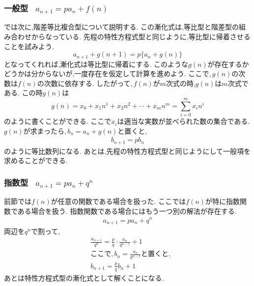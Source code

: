 \documentclass[dvipdfmx,a4paper,11pt,fleqn,openany]{jsbook}
\begin{document}
    \subsubsection{一般型 \, $\displaystyle a_{n+1}=pa_n+f(n)$}
      では次に,階差等比複合型について説明する.
      この漸化式は,等比型と階差型の組み合わせからなっている.
      先程の特性方程式型と同じように,等比型に帰着させることを試みよう.
      \[
        a_{n+1}+g(n+1)=p\{a_n+g(n)\}
      \]
      となってくれれば,漸化式は等比型に帰着にする.
      このような$g(n)$が存在するかどうかは分からないが,一度存在を仮定して計算を進めよう.
      ここで,\,$g(n)$の次数は$f(n)$の次数に依存する.
      したがって,\,$f(n)$が$m$次式の時,$g(n)$は$m$次式である.
      この時$g(n)$は
      \[
        g(n) = x_0 + x_1 n^1 + x_2 n^2  + \cdots +x_{m} n^m =\sum_{i=0}^{m} x_i n^{i}
      \]
      のように書くことができる.
      ここで$x_i$は適当な実数が並べられた数の集合である.
      $g(n)$が求まったら,\,$b_n=a_n+g(n)$と置くと,
      \begin{align*}
        b_{n+1}=pb_n
      \end{align*}
      のように等比数列になる.
      あとは,先程の特性方程式型と同じようにして一般項を求めることができる.
    \subsubsection{指数型  \, $\displaystyle a_{n+1}=pa_n+q^n$}
      前節では$f(n)$が任意の関数である場合を扱った.
      ここでは$f(n)$が特に指数関数である場合を扱う.
      指数関数である場合にはもう一つ別の解法が存在する.
      \begin{align*}
        a_{n+1}=pa_n+q^n
      \end{align*}
      両辺を$q^n$で割って,
      \begin{align*}      
        &\frac{a_{n+1}}{q^n}=\frac{p}{q}\cdot\frac{a_n}{q^{n-1}}+1\\
        &\text{ここで,}\,b_n=\frac{a_n}{q^{n-1}}\text{と置くと,}\\
        &b_{n+1}=\frac{p}{q}b_n+1
      \end{align*}
      あとは特性方程式型の漸化式として解くことになる.
\end{document}
